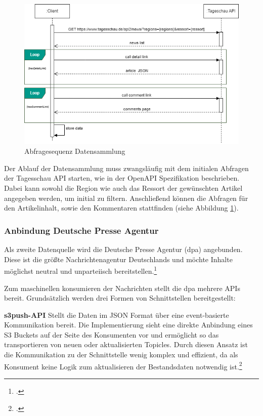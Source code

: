 \newpage

\begin{figure}[H]
    \centering
    \includegraphics[width=1\linewidth]{abbildungen/Request Sequence.drawio.png}
    \caption{Abfragesequenz Datensammlung}
    \label{fig:Abfragesequenz Datensammlung}
\end{figure}
Der Ablauf der Datensammlung muss zwangsläufig mit dem initialen Abfragen der Tagesschau API starten, wie in der OpenAPI Spezifikation beschrieben. Dabei kann sowohl die Region wie auch das Ressort der gewünschten Artikel angegeben werden, um initial zu filtern. Anschließend können die Abfragen für den Artikelinhalt, sowie den Kommentaren stattfinden (siehe Abbildung \ref{fig:Abfragesequenz Datensammlung}). 

\newpage
\subsubsection{Anbindung Deutsche Presse Agentur}
Als zweite Datenquelle wird die Deutsche Presse Agentur (dpa) angebunden. 
Diese ist die größte Nachrichtenagentur Deutschlands und möchte Inhalte möglichst neutral und unparteiisch bereitstellen.\footcite[Vgl.][]{Dpa.about.2024}

Zum maschinellen konsumieren der Nachrichten stellt die dpa mehrere APIs bereit.
Grundsätzlich werden drei Formen von Schnittstellen bereitgestellt:

\textbf{s3push-API}
Stellt die Daten im JSON Format über eine event-basierte Kommunikation bereit. Die Implementierung sieht eine direkte Anbindung eines S3 Buckets auf der Seite des Konsumenten vor und ermöglicht so das transportieren von neuen oder aktualisierten Topicles. Durch diesen Ansatz ist die Kommunikation zu der Schnittstelle wenig komplex und effizient, da als Konsument keine Logik zum aktualisieren der Bestandsdaten notwendig ist.\footcite[Vgl.][]{DpaApiDocumentation.APIs.2024}

